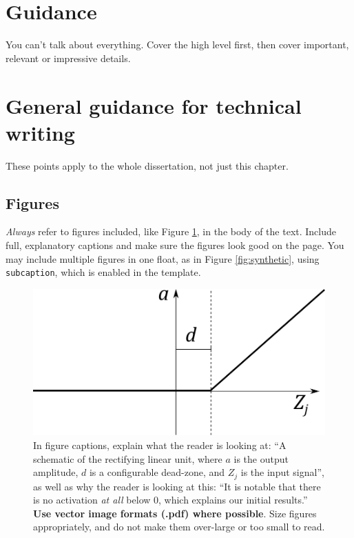 \documentclass{l4proj}
\begin{document}
\section{Guidance}
You can't talk about everything. Cover the high level first, then cover important, relevant or impressive details.

\section{General guidance for technical writing}

These points apply to the whole dissertation, not just this chapter.

\subsection{Figures}
\emph{Always} refer to figures included, like Figure \ref{fig:relu}, in the body of the text. Include full, explanatory captions and make sure the figures look good on the page.
You may include multiple figures in one float, as in Figure \ref{fig:synthetic}, using \texttt{subcaption}, which is enabled in the template.


\begin{figure}[htb]
    \centering
    \includegraphics[width=0.5\linewidth]{images/relu.pdf}    

    \caption{In figure captions, explain what the reader is looking at: ``A schematic of the rectifying linear unit, where $a$ is the output amplitude,
    $d$ is a configurable dead-zone, and $Z_j$ is the input signal'', as well as why the reader is looking at this: 
    ``It is notable that there is no activation \emph{at all} below 0, which explains our initial results.'' 
    \textbf{Use vector image formats (.pdf) where possible}. Size figures appropriately, and do not make them over-large or too small to read.
    }

    \label{fig:relu} 
\end{figure}
\end{document}
